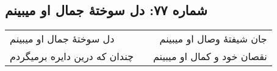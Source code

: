 \begin{center}
\section*{شماره ۷۷: دل سوختۀ جمال او میبینم}
\label{sec:077}
\begin{longtable}{l p{0.5cm} r}
دل سوختهٔ جمال او میبینم
&&
جان شیفتهٔ وصال او میبینم
\\
چندان که درین دایره برمیگردم
&&
نقصان خود و کمال او میبینم
\\
\end{longtable}
\end{center}
